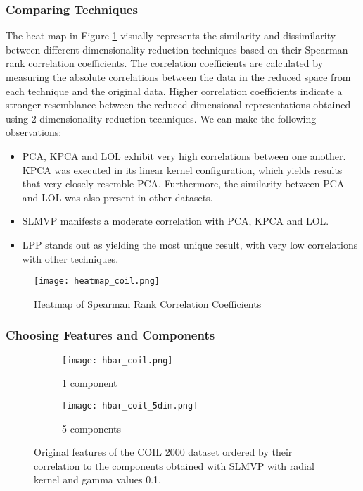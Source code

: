 \subsubsection{Comparing Techniques}

The heat map in Figure \ref{fig:heatmap-coil} visually represents the similarity and dissimilarity between different dimensionality reduction techniques based on their Spearman rank correlation coefficients. The correlation coefficients are calculated by measuring the absolute correlations between the data in the reduced space from each technique and the original data. Higher correlation coefficients indicate a stronger resemblance between the reduced-dimensional representations obtained using 2 dimensionality reduction techniques. We can make the following observations:

\begin{itemize}
    \item PCA, KPCA and LOL exhibit very high correlations between one another. KPCA was executed in its linear kernel configuration, which yields results that very closely resemble PCA. Furthermore, the similarity between PCA and LOL was also present in other datasets.
    \item SLMVP manifests a moderate correlation with PCA, KPCA and LOL.
    \item LPP stands out as yielding the most unique result, with very low correlations with other techniques.
\end{itemize}

\begin{figure}[!ht]
    \centering
    \texttt{[image: heatmap\_coil.png]}
    \caption{Heatmap of Spearman Rank Correlation Coefficients}
    \label{fig:heatmap-coil}
\end{figure}

\subsubsection{Choosing Features and Components}

\begin{figure}[!ht]
    \centering
    \begin{subfigure}{\textwidth}
        \centering
        \texttt{[image: hbar\_coil.png]}
        \caption{1 component}
    \end{subfigure}

    \begin{subfigure}{\textwidth}
        \centering
        \texttt{[image: hbar\_coil\_5dim.png]}
        \caption{5 components}
    \end{subfigure}
    \caption{Original features of the COIL 2000 dataset ordered by their correlation to the components obtained with SLMVP with radial kernel and gamma values 0.1.}
    \label{fig:hbar-coil}
\end{figure}

